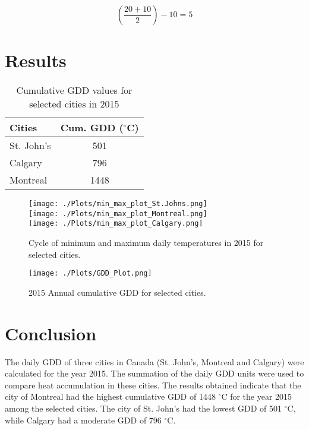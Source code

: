 \documentclass{article}
\begin{document}
\[ \left(\frac {20+10}{2}\right)-10=5 \] \par

\section{ \bf Results}

\begin{table}[h]
\caption{Cumulative GDD values for selected cities in 2015} 
\label{gdd-results}
\centering
\begin{tabular}{l c}
\hline
\textbf{Cities} & \textbf{Cum. GDD} \textbf($^{\circ}$C) \\
\hline
St. John's & 501 \\
Calgary & 796 \\
Montreal & 1448 \\
\hline
\end{tabular}
\end{table}


\begin{center}
\begin{figure}
\texttt{[image: ./Plots/min\_max\_plot\_St.Johns.png]}\\

\texttt{[image: ./Plots/min\_max\_plot\_Montreal.png]}\\

\texttt{[image: ./Plots/min\_max\_plot\_Calgary.png]}\\

\caption{Cycle of minimum and maximum daily temperatures in 2015 for selected cities.}
\label{gdd-cycle}
\end{figure}
\end{center}


\begin{center}
\begin{figure}
\texttt{[image: ./Plots/GDD\_Plot.png]}
\caption{2015 Annual cumulative GDD for selected cities.}
\label{gdd-cycle}
\end{figure}
\end{center}


\section{Conclusion}
The daily GDD of three cities in Canada (St. John's, Montreal and Calgary) were calculated for the year 2015. The summation of the daily GDD units were used to compare heat accumulation in these cities. The results obtained indicate that the city of Montreal had the highest cumulative GDD of 1448 $^{\circ}$C for the year 2015 among the selected cities. The city of St. John's had the lowest GDD of 501 $^{\circ}$C, while Calgary had a moderate GDD of 796 $^{\circ}$C.
\end{document}
